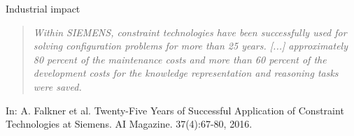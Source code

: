 \begin{frame}[c]{Industrial impact}
\begin{quote}\itshape
  Within SIEMENS,
  \alert<2>{constraint technologies} have been successfully used for solving configuration problems for more than \alert<2>{25 years}.
  [...]
  approximately \alert<2>{80 percent} of the \alert<2>{maintenance costs} and
  more than \alert<2>{60 percent} of the \alert<2>{development costs} for the knowledge representation and reasoning tasks were saved.
\end{quote}
\medskip
\tiny
In:
A. Falkner et al.
Twenty-Five Years of Successful Application of Constraint Technologies at Siemens.
AI Magazine.
37(4):67-80, 2016.
\end{frame}
%
